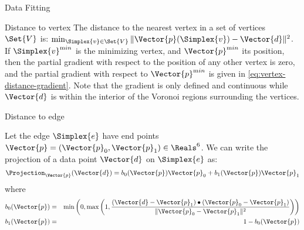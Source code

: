 \begin{plSection}{Data Fitting}
\begin{plSection}{Distance to vertex}
The distance to the nearest vertex in a set of vertices $\Set{V}$ is:
$\min_{\Simplex{v} \in \Set{V}} \| \Vector{p}(\Simplex{v}) - \Vector{d} \|^2$.
If $\Simplex{v}^{\mathrm min}$ is the minimizing vertex,
and
$\Vector{p}^{\mathrm min}$ its position,
then the partial gradient with respect
to the position of any other vertex is zero,
and the partial gradient with respect to $\Vector{p}^{\mathrm min}$
is given in \cref{eq:vertex-distance-gradient}.
Note that the gradient is only defined and continuous
while $\Vector{d}$ is within the interior of the
Voronoi regions surrounding the vertices.

\end{plSection}%
\begin{plSection}{Distance to edge}
\label{sec:Distance-to-edge}

Let the edge $\Simplex{e}$ have end points $\Vector{p} = (\Vector{p}_0, \Vector{p}_1) \in \Reals^6$.
We can write the projection of a data point $\Vector{d}$ on $\Simplex{e}$ as:
\begin{equation}
\Projection_\Vector{p} (\Vector{d}) = b_0(\Vector{p}) \Vector{p}_0 + b_1(\Vector{p}) \Vector{p}_1
\end{equation}
where
\begin{eqnarray}
b_0(\Vector{p}) & = &
\min\left(0,\max\left(1,
{{ (\Vector{d} - \Vector{p}_1) \bullet (\Vector{p}_0 - \Vector{p}_1) }
\over
{ \| \Vector{p}_0 - \Vector{p}_1 \|^2 }
}\right) \right) \\
b_1(\Vector{p}) & = & 1 - b_0(\Vector{p})
\nonumber
\end{eqnarray}


\end{plSection}
\end{plSection}
